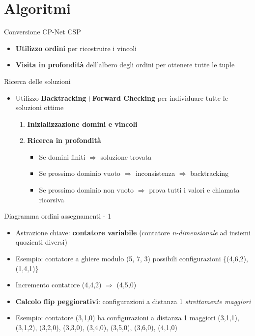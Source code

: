 \section{Algoritmi}
\begin{frame}{Conversione CP-Net CSP}
\begin{itemize}
  \item \textbf{Utilizzo ordini} per ricostruire i vincoli
  \item \textbf{Visita in profondità} dell'albero degli ordini per ottenere tutte le tuple
\end{itemize}
\end{frame}

\begin{frame}{Ricerca delle soluzioni}
\begin{itemize}
  \item Utilizzo \textbf{Backtracking+Forward Checking} per individuare tutte le soluzioni ottime
  \begin{enumerate}
  	\item \textbf{Inizializzazione domini e vincoli}
  	\item \textbf{Ricerca in profondità}
  	\begin{itemize}
  		\item Se domini finiti $\Rightarrow$ soluzione trovata
  	    \item Se prossimo dominio vuoto $\Rightarrow$ inconsistenza $\Rightarrow$ backtracking
  	    \item Se prossimo dominio non vuoto $\Rightarrow$ prova tutti i valori e chiamata ricorsiva
  	\end{itemize}
  \end{enumerate}
\end{itemize}
\end{frame}

\begin{frame}{Diagramma ordini assegnamenti - 1}
\begin{itemize}
  \item Astrazione chiave: \textbf{contatore variabile} (contatore \textit{n-dimensionale} ad insiemi quozienti diversi)
  \item Esempio: contatore a ghiere modulo  (5, 7, 3) possibili configurazioni \{(4,6,2),(1,4,1)\}
  \item Incremento contatore (4,4,2) $\Rightarrow$ (4,5,0)
  \pause
  \item \textbf{Calcolo flip peggiorativi}: configurazioni a distanza 1 \textit{strettamente maggiori}
  \item Esempio: contatore (3,1,0) ha configurazioni a distanza 1 maggiori (3,1,1), (3,1,2), (3,2,0), (3,3,0), (3,4,0), (3,5,0), (3,6,0), (4,1,0)
\end{itemize}
\end{frame}

